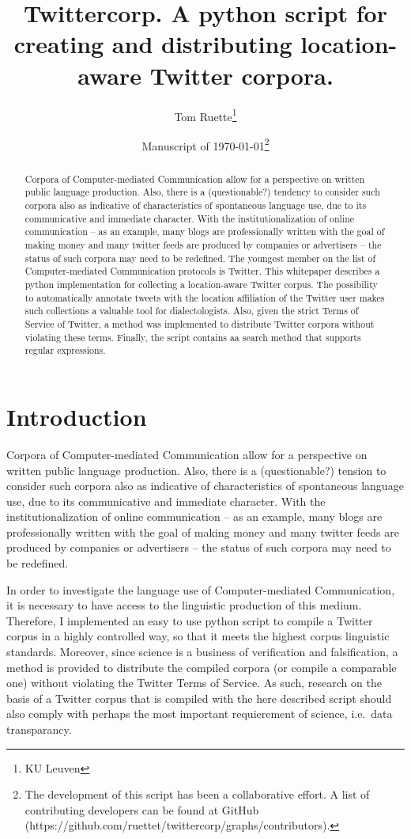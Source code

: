 \documentclass[a4paper,10pt]{article}
\title{Twittercorp. A python script for creating and distributing location-aware Twitter corpora.}
\author{Tom Ruette\thanks{KU Leuven}}
\date{Manuscript of \today\thanks{The development of this script has been a collaborative effort. A list of contributing developers can be found at GitHub (https://github.com/ruettet/twittercorp/graphs/contributors).}}
\begin{document}
\maketitle

\begin{abstract}
Corpora of Computer-mediated Communication allow for a perspective on written public language production. Also, there is a (questionable?) tendency to consider such corpora also as indicative of characteristics of spontaneous language use, due to its communicative and immediate character. With the institutionalization of online communication -- as an example, many blogs are professionally written with the goal of making money and many twitter feeds are produced by companies or advertisers -- the status of such corpora may need to be redefined. The youngest member on the list of Computer-mediated Communication protocols is Twitter. This whitepaper describes a python implementation for collecting a location-aware Twitter corpus. The possibility to automatically annotate tweets with the location affiliation of the Twitter user makes such collections a valuable tool for dialectologists. Also, given the strict Terms of Service of Twitter, a method was implemented to distribute Twitter corpora without violating these terms. Finally, the script contains aa search method that supports regular expressions.
\end{abstract}

\section{Introduction}

Corpora of Computer-mediated Communication allow for a perspective on written public language production. Also, there is a (questionable?) tension to consider such corpora also as indicative of characteristics of spontaneous language use, due to its communicative and immediate character. With the institutionalization of online communication -- as an example, many blogs are professionally written with the goal of making money and many twitter feeds are produced by companies or advertisers -- the status of such corpora may need to be redefined.

In order to investigate the language use of Computer-mediated Communication, it is necessary to have access to the linguistic production of this medium. Therefore, I implemented an easy to use python script to compile a Twitter corpus in a highly controlled way, so that it meets the highest corpus linguistic standards. Moreover, since science is a business of verification and falsification, a method is provided to distribute the compiled corpora (or compile a comparable one) without violating the Twitter Terms of Service. As such, research on the basis of a Twitter corpus that is compiled with the here described script should also comply with perhaps the most important requierement of science, i.e.~data transparancy.
\end{document}
